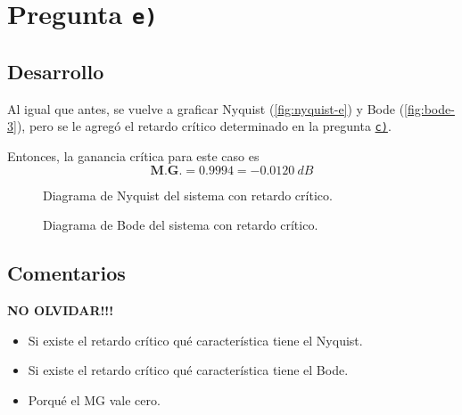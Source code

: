 \section{Pregunta \texttt{e)}}\label{pregunta-e}

\subsection{Desarrollo}

Al igual que antes, se vuelve a graficar Nyquist (\autoref{fig:nyquist-e}) y
Bode (\autoref{fig:bode-3}), pero se le agregó el retardo crítico determinado
en la pregunta \hyperref[pregunta-c]{\texttt{c)}}.

Entonces, la ganancia crítica para este caso es
\begin{equation}
  \boxed{\textbf{M.G.} = 0.9994 = -0.0120\ \unit{dB}}
\end{equation}

\begin{figure}[h]
  \centering
  
  \caption{Diagrama de Nyquist del sistema con retardo crítico.}
  \label{fig:nyquist-e}
\end{figure}

\begin{figure}[h]
  \centering
  
  \caption{Diagrama de Bode del sistema con retardo crítico.}
  \label{fig:bode-e}
\end{figure}


\FloatBarrier
\subsection{Comentarios}

\textbf{NO OLVIDAR!!!}


\begin{itemize}
  \item Si existe el retardo crítico qué característica tiene el Nyquist.
  \item Si existe el retardo crítico qué característica tiene el Bode.
  \item Porqué el MG vale cero.
\end{itemize}

